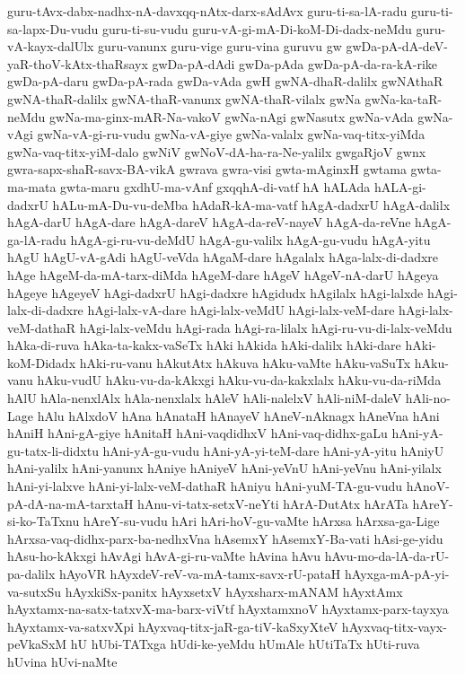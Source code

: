 {guru-tAvx-dabx-nadhx-nA-davxqq-nAtx-darx-sAdAvx
guru-ti-sa-lA-radu
guru-ti-sa-lapx-Du-vudu
guru-ti-su-vudu
guru-vA-gi-mA-Di-koM-Di-dadx-neMdu
guru-vA-kayx-dalUlx
guru-vanunx
guru-vige
guru-vina
guruvu
gw
gwDa-pA-dA-deV-yaR-thoV-kAtx-thaRsayx
gwDa-pA-dAdi
gwDa-pAda
gwDa-pA-da-ra-kA-rike
gwDa-pA-daru
gwDa-pA-rada
gwDa-vAda
gwH
gwNA-dhaR-dalilx
gwNAthaR
gwNA-thaR-dalilx
gwNA-thaR-vanunx
gwNA-thaR-vilalx
gwNa
gwNa-ka-taR-neMdu
gwNa-ma-ginx-mAR-Na-vakoV
gwNa-nAgi
gwNasutx
gwNa-vAda
gwNa-vAgi
gwNa-vA-gi-ru-vudu
gwNa-vA-giye
gwNa-valalx
gwNa-vaq-titx-yiMda
gwNa-vaq-titx-yiM-dalo
gwNiV
gwNoV-dA-ha-ra-Ne-yalilx
gwgaRjoV
gwnx
gwra-sapx-shaR-savx-BA-vikA
gwrava
gwra-visi
gwta-mAginxH
gwtama
gwta-ma-mata
gwta-maru
gxdhU-ma-vAnf
gxqqhA-di-vatf
hA
hALAda
hALA-gi-dadxrU
hALu-mA-Du-vu-deMba
hAdaR-kA-ma-vatf
hAgA-dadxrU
hAgA-dalilx
hAgA-darU
hAgA-dare
hAgA-dareV
hAgA-da-reV-nayeV
hAgA-da-reVne
hAgA-ga-lA-radu
hAgA-gi-ru-vu-deMdU
hAgA-gu-valilx
hAgA-gu-vudu
hAgA-yitu
hAgU
hAgU-vA-gAdi
hAgU-veVda
hAgaM-dare
hAgalalx
hAga-lalx-di-dadxre
hAge
hAgeM-da-mA-tarx-diMda
hAgeM-dare
hAgeV
hAgeV-nA-darU
hAgeya
hAgeye
hAgeyeV
hAgi-dadxrU
hAgi-dadxre
hAgidudx
hAgilalx
hAgi-lalxde
hAgi-lalx-di-dadxre
hAgi-lalx-vA-dare
hAgi-lalx-veMdU
hAgi-lalx-veM-dare
hAgi-lalx-veM-dathaR
hAgi-lalx-veMdu
hAgi-rada
hAgi-ra-lilalx
hAgi-ru-vu-di-lalx-veMdu
hAka-di-ruva
hAka-ta-kakx-vaSeTx
hAki
hAkida
hAki-dalilx
hAki-dare
hAki-koM-Didadx
hAki-ru-vanu
hAkutAtx
hAkuva
hAku-vaMte
hAku-vaSuTx
hAku-vanu
hAku-vudU
hAku-vu-da-kAkxgi
hAku-vu-da-kakxlalx
hAku-vu-da-riMda
hAlU
hAla-nenxlAlx
hAla-nenxlalx
hAleV
hAli-nalelxV
hAli-niM-daleV
hAli-no-Lage
hAlu
hAlxdoV
hAna
hAnataH
hAnayeV
hAneV-nAknagx
hAneVna
hAni
hAniH
hAni-gA-giye
hAnitaH
hAni-vaqdidhxV
hAni-vaq-didhx-gaLu
hAni-yA-gu-tatx-li-didxtu
hAni-yA-gu-vudu
hAni-yA-yi-teM-dare
hAni-yA-yitu
hAniyU
hAni-yalilx
hAni-yanunx
hAniye
hAniyeV
hAni-yeVnU
hAni-yeVnu
hAni-yilalx
hAni-yi-lalxve
hAni-yi-lalx-veM-dathaR
hAniyu
hAni-yuM-TA-gu-vudu
hAnoV-pA-dA-na-mA-tarxtaH
hAnu-vi-tatx-setxV-neYti
hArA-DutAtx
hArATa
hAreY-si-ko-TaTxnu
hAreY-su-vudu
hAri
hAri-hoV-gu-vaMte
hArxsa
hArxsa-ga-Lige
hArxsa-vaq-didhx-parx-ba-nedhxVna
hAsemxY
hAsemxY-Ba-vati
hAsi-ge-yidu
hAsu-ho-kAkxgi
hAvAgi
hAvA-gi-ru-vaMte
hAvina
hAvu
hAvu-mo-da-lA-da-rU-pa-dalilx
hAyoVR
hAyxdeV-reV-va-mA-tamx-savx-rU-pataH
hAyxga-mA-pA-yi-va-sutxSu
hAyxkiSx-panitx
hAyxsetxV
hAyxsharx-mANAM
hAyxtAmx
hAyxtamx-na-satx-tatxvX-ma-barx-viVtf
hAyxtamxnoV
hAyxtamx-parx-tayxya
hAyxtamx-va-satxvXpi
hAyxvaq-titx-jaR-ga-tiV-kaSxyXteV
hAyxvaq-titx-vayx-peVkaSxM
hU
hUbi-TATxga
hUdi-ke-yeMdu
hUmAle
hUtiTaTx
hUti-ruva
hUvina
hUvi-naMte
}
